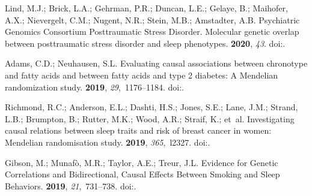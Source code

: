 \documentclass[genes,article,accept,moreauthors,pdftex]{Definitions/mdpi}
\begin{document}
\begin{thebibliography}{999}

Lind, M.J.; Brick, L.A.; Gehrman, P.R.; Duncan, L.E.; Gelaye, B.; Maihofer,
  A.X.; Nievergelt, C.M.; Nugent, N.R.; Stein, M.B.; Amstadter, A.B.
  {Psychiatric Genomics Consortium Posttraumatic Stress Disorder}.
\newblock Molecular genetic overlap between posttraumatic stress disorder and
  sleep phenotypes.
 {\bf 2020}, {\em 43}.
\newblock
  doi:{\href{https://doi.org/10.1093/sleep/zsz257}{}}.

Adams, C.D.; Neuhausen, S.L.
\newblock Evaluating causal associations between chronotype and fatty acids and
  between fatty acids and type 2 diabetes: {A} {Mendelian} randomization study.
 {\bf
  2019}, {\em 29},~1176--1184.
\newblock
  doi:{\href{https://doi.org/10.1016/j.numecd.2019.06.020}{}}.

Richmond, R.C.; Anderson, E.L.; Dashti, H.S.; Jones, S.E.; Lane, J.M.; Strand,
  L.B.; Brumpton, B.; Rutter, M.K.; Wood, A.R.; Straif, K.; et~al.
\newblock Investigating causal relations between sleep traits and risk of
  breast cancer in women: Mendelian randomisation study.
 {\bf 2019}, {\em 365},~l2327.
\newblock
  doi:{\href{https://doi.org/10.1136/bmj.l2327}{}}.

Gibson, M.; Munafò, M.R.; Taylor, A.E.; Treur, J.L.
\newblock Evidence for {Genetic} {Correlations} and {Bidirectional}, {Causal}
  {Effects} {Between} {Smoking} and {Sleep} {Behaviors}.
 {\bf 2019}, {\em 21},~731--738.
\newblock
  doi:{\href{https://doi.org/10.1093/ntr/nty230}{}}.


\end{thebibliography}
\end{document}
